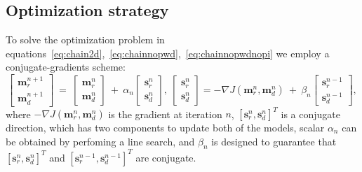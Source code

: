 \subsection{Optimization strategy}

To solve the optimization problem in equations~\ref{eq:chain2d},~\ref{eq:chainnopwd},~\ref{eq:chainnopwdnopi}
we employ a conjugate-gradients scheme:
\begin{equation}
\label{eq:itthr1}
\begin{bmatrix} \mathbf{m}_{r}^{n+1} \\ \mathbf{m}_{d}^{n+1}\end{bmatrix}\ =\ \begin{bmatrix} \mathbf{m}_{r}^{n} \\ \mathbf{m}_{d}^{n}\end{bmatrix}\ +\ \alpha_{n}
\begin{bmatrix} \mathbf{s}_{r}^{n}\\ \mathbf{s}_{d}^{n}  \end{bmatrix},\ \begin{bmatrix} \mathbf{s}_{r}^{n}\\ \mathbf{s}_{d}^{n}  \end{bmatrix}=-\nabla J(\mathbf{m}_{r}^{n},\mathbf{m}_{d}^{n})\ +\ \beta_{n}
\begin{bmatrix}\mathbf{s}_{r}^{n-1}\\ \mathbf{s}_{d}^{n-1} \end{bmatrix},
\end{equation}
where $-\nabla J(\mathbf{m}_{r}^{n},\mathbf{m}_{d}^{n})$ is the gradient at iteration $n$, $[\mathbf{s}_{r}^{n}, \mathbf{s}_{d}^{n}]^T$ is a conjugate direction, which has two components 
to update both of the models, scalar $\alpha_{n}$ can be obtained by perfoming a line search, and $\beta_n$ is designed
to guarantee that $[\mathbf{s}_{r}^{n}, \mathbf{s}_{d}^{n}]^T$ and $[\mathbf{s}_{r}^{n-1}, \mathbf{s}_{d}^{n-1}]^T$ are conjugate.

